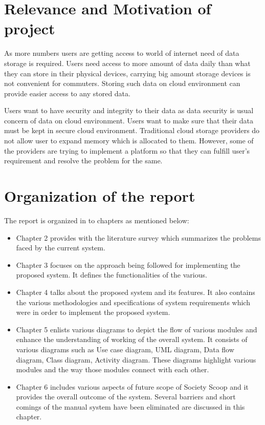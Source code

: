 \section{Relevance and Motivation of project}

\hspace{0.6cm}As more numbers users are getting access to world of internet need of data storage is required. Users need access to more amount of data daily than what they can store in their physical devices, carrying big amount storage devices is not convenient for commuters. Storing such data on cloud environment can provide easier access to any stored data. 

\vspace{0.2cm} Users want to have security and integrity to their data as data security is usual concern of data on cloud environment. Users want to make sure that their data must be kept in secure cloud environment. Traditional cloud storage providers do not allow user to expand memory which is allocated to them. However, some of the providers are trying to implement a platform so that they can fulfill user’s requirement and resolve the problem for the same.\\

\section{Organization of the report}
 The report is organized in to chapters as mentioned below:
 \begin{itemize}
 \item Chapter 2 provides with the literature survey which summarizes the problems faced by the current system.
 \item Chapter 3 focuses on the approach being followed for implementing the proposed system. It defines the functionalities of the various.

 \item Chapter 4 talks about the proposed system and its features. It also contains the various methodologies and specifications of system requirements which were in order to implement the proposed system.
 
 \item Chapter 5 enlists various diagrams to depict the flow of various modules and enhance the understanding of working of the overall system. It consists of various diagrams such as Use case diagram, UML diagram, Data flow diagram, Class diagram, Activity diagram. These diagrams highlight various modules and the way those modules connect with each other.
 
 \item Chapter 6 includes various aspects of future scope of Society Scoop and it provides  the overall outcome of the system. Several barriers and short comings of the manual system have been eliminated are discussed in this chapter.
\end{itemize}
